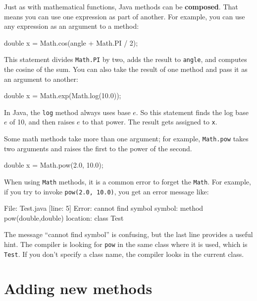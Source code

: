 \documentclass[12pt]{book}
\theoremstyle{exercise}
\newcommand{\java}[1]{\verb"#1"}
\begin{document}

Just as with mathematical functions, Java methods can be {\bf composed}.
That means you can use one expression as part of another.
For example, you can use any expression as an argument to a method:

\begin{code}
    double x = Math.cos(angle + Math.PI / 2);
\end{code}

This statement divides \java{Math.PI} by two, adds the result to \java{angle}, and computes the cosine of the sum.
You can also take the result of one method and pass it as an argument to another:

\begin{code}
    double x = Math.exp(Math.log(10.0));
\end{code}

In Java, the \java{log} method always uses base $e$.
So this statement finds the log base $e$ of 10, and then raises $e$ to that power.
The result gets assigned to \java{x}.

Some math methods take more than one argument;
for example, \java{Math.pow} takes two arguments and raises the first to the power of the second.

\begin{code}
    double x = Math.pow(2.0, 10.0);
\end{code}

When using \java{Math} methods, it is a common error to forget the \java{Math}.
For example, if you try to invoke \java{pow(2.0, 10.0)}, you get an error message like:

\begin{stdout}
File: Test.java  [line: 5]
Error: cannot find symbol
  symbol:   method pow(double,double)
  location: class Test
\end{stdout}

The message ``cannot find symbol'' is confusing, but the last line provides a useful hint.
The compiler is looking for \java{pow} in the same class where it is used, which is \java{Test}.
If you don't specify a class name, the compiler looks in the current class.


\section{Adding new methods}
\label{adding_methods}

\end{document}
